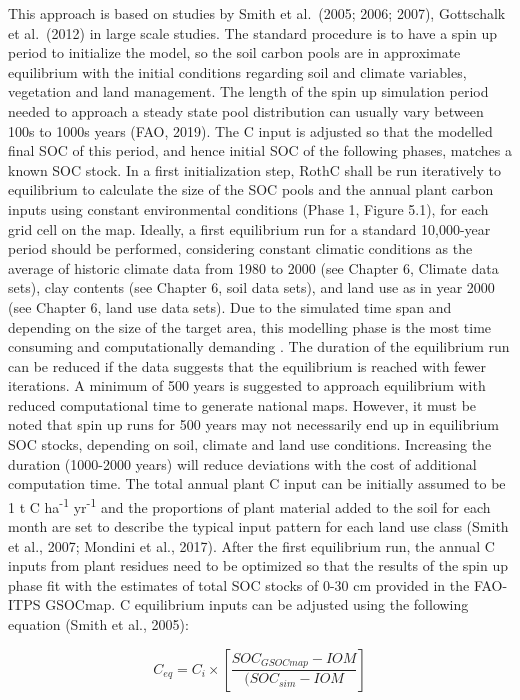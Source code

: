 \documentclass[
  10pt,
  b5paper,
]{book}
\begin{document}
This approach is based on studies by Smith et al.~(2005; 2006; 2007), Gottschalk et al.~(2012) in large scale studies. The standard procedure is to have a spin up period to initialize the model, so the soil carbon pools are in approximate equilibrium with the initial conditions regarding soil and climate variables, vegetation and land management. The length of the spin up simulation period needed to approach a steady state pool distribution can usually vary between 100s to 1000s years (FAO, 2019). The C input is adjusted so that the modelled final SOC of this period, and hence initial SOC of the following phases, matches a known SOC stock.
In a first initialization step, RothC shall be run iteratively to equilibrium to calculate the size of the SOC pools and the annual plant carbon inputs using constant environmental conditions (Phase 1, Figure 5.1), for each grid cell on the map. Ideally, a first equilibrium run for a standard 10,000-year period should be performed, considering constant climatic conditions as the average of historic climate data from 1980 to 2000 (see Chapter 6, Climate data sets), clay contents (see Chapter 6, soil data sets), and land use as in year 2000 (see Chapter 6, land use data sets). Due to the simulated time span and depending on the size of the target area, this modelling phase is the most time consuming and computationally demanding . The duration of the equilibrium run can be reduced if the data suggests that the equilibrium is reached with fewer iterations. A minimum of 500 years is suggested to approach equilibrium with reduced computational time to generate national maps. However, it must be noted that spin up runs for 500 years may not necessarily end up in equilibrium SOC stocks, depending on soil, climate and land use conditions. Increasing the duration (1000-2000 years) will reduce deviations with the cost of additional computation time.
The total annual plant C input can be initially assumed to be 1 t C ha\textsuperscript{-1} yr\textsuperscript{-1} and the proportions of plant material added to the soil for each month are set to describe the typical input pattern for each land use class (Smith et al., 2007; Mondini et al., 2017). After the first equilibrium run, the annual C inputs from plant residues need to be optimized so that the results of the spin up phase fit with the estimates of total SOC stocks of 0-30 cm provided in the FAO-ITPS GSOCmap. C equilibrium inputs can be adjusted using the following equation (Smith et al., 2005):

\begin{equation}
\tag{5.1}
C_{eq}=C_i \times[\frac{SOC_{GSOCmap}-IOM}{(SOC_{sim}-IOM}]                                              
\end{equation}
\end{document}
